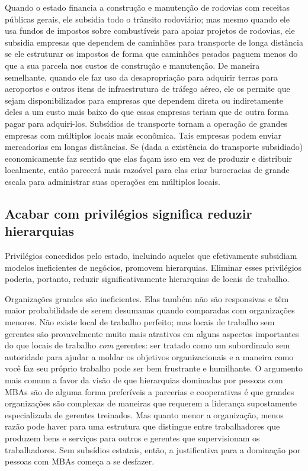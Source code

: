 Quando o estado financia a construção e manutenção de rodovias com receitas públicas gerais, ele subsidia todo o trânsito rodoviário; mas mesmo quando ele usa fundos de impostos sobre combustíveis para apoiar projetos de rodovias, ele subsidia empresas que dependem de caminhões para transporte de longa distância se ele estruturar os impostos de forma que caminhões pesados paguem menos do que a sua parcela nos custos de construção e manutenção. De maneira semelhante, quando ele faz uso da desapropriação para adquirir terras para aeroportos e outros itens de infraestrutura de tráfego aéreo, ele os permite que sejam disponibilizados para empresas que dependem direta ou indiretamente deles a um custo mais baixo do que essas empresas teriam que de outra forma pagar para adquiri-los. Subsídios de transporte tornam a operação de grandes empresas com múltiplos locais mais econômica. Tais empresas podem enviar mercadorias em longas distâncias. Se (dada a existência do transporte subsidiado) economicamente faz sentido que elas façam isso em vez de produzir e distribuir localmente, então parecerá mais razoável para elas criar burocracias de grande escala para administrar suas operações em múltiplos locais.

\subsection*{Acabar com privilégios significa reduzir hierarquias}

Privilégios concedidos pelo estado, incluindo aqueles que efetivamente subsidiam modelos ineficientes de negócios, promovem hierarquias. Eliminar esses privilégios poderia, portanto, reduzir significativamente hierarquias de locais de trabalho.

Organizações grandes são ineficientes. Elas também não são responsivas e têm maior probabilidade de serem desumanas quando comparadas com organizações menores. Não existe local de trabalho perfeito; mas locais de trabalho sem gerentes são provavelmente muito mais atrativos em alguns aspectos importantes do que locais de trabalho \emph{com} gerentes: ser tratado como um subordinado sem autoridade para ajudar a moldar os objetivos organizacionais e a maneira como você faz seu próprio trabalho pode ser bem frustrante e humilhante. O argumento mais comum a favor da visão de que hierarquias dominadas por pessoas com MBAs são de alguma forma preferíveis a parcerias e cooperativas é que grandes organizações são complexas de maneiras que requerem a liderança supostamente especializada de gerentes treinados. Mas quanto menor a organização, menos razão pode haver para uma estrutura que distingue entre trabalhadores que produzem bens e serviços para outros e gerentes que supervisionam os trabalhadores. Sem subsídios estatais, então, a justificativa para a dominação por pessoas com MBAs começa a se desfazer.

